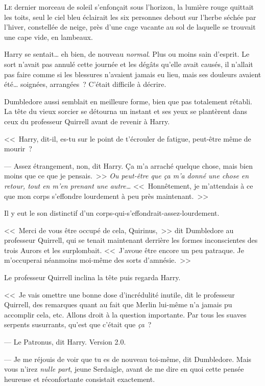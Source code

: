 
\lettrine{L}{e} dernier morceau de soleil s'enfonçait sous l'horizon, la lumière rouge quittait les toits, seul le ciel bleu éclairait les six personnes debout sur l'herbe séchée par l'hiver, constellée de neige, près d'une cage vacante au sol de laquelle se trouvait une cape vide, en lambeaux.

Harry se sentait… eh bien, de nouveau \emph{normal}. Plus ou moins sain d'esprit. Le sort n'avait pas annulé cette journée et les dégâts qu'elle avait causés, il n'allait pas faire comme si les blessures n'avaient jamais eu lieu, mais ses douleurs avaient été… soignées, arrangées~? C'était difficile à décrire.

Dumbledore aussi semblait en meilleure forme, bien que pas totalement rétabli. La tête du vieux sorcier se détourna un instant et ses yeux se plantèrent dans ceux du professeur Quirrell avant de revenir à Harry.

<<~Harry, dit-il, es-tu sur le point de t'écrouler de fatigue, peut-être même de mourir~?

--- Assez étrangement, non, dit Harry. Ça m'a arraché quelque chose, mais bien moins que ce que je pensais.~>> \emph{Ou peut-être que ça m'a donné une chose en retour, tout en m'en prenant une autre…} <<~Honnêtement, je m'attendais à ce que mon corps s'effondre lourdement à peu près maintenant.~>>

Il y eut le son distinctif d'un corps-qui-s'effondrait-assez-lourdement.

<<~Merci de vous être occupé de cela, Quirinus,~>> dit Dumbledore au professeur Quirrell, qui se tenait maintenant derrière les formes inconscientes des trois Aurors et les surplombait. <<~J'avoue être encore un peu patraque. Je m'occuperai néanmoins moi-même des sorts d'amnésie.~>>

Le professeur Quirrell inclina la tête puis regarda Harry.

<<~Je vais omettre une bonne dose d'incrédulité inutile, dit le professeur Quirrell, des remarques quant au fait que Merlin lui-même n'a jamais pu accomplir cela, etc. Allons droit à la question importante. Par tous les suaves serpents susurrants, qu'est que c'était que \emph{ça}~?

--- Le Patronus, dit Harry. Version 2.0.

--- Je me réjouis de voir que tu es de nouveau toi-même, dit Dumbledore. Mais vous n'irez \emph{nulle part}, jeune Serdaigle, avant de me dire en quoi cette pensée heureuse et réconfortante consistait exactement.

